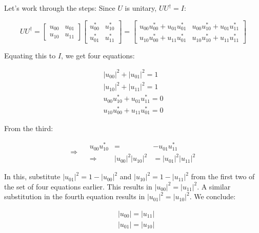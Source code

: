 \documentclass[main.tex]{subfiles}
\begin{document}
    Let's work through the steps: Since $U$ is unitary, $U U^{\dagger}=I$:
    
    $$
    U U^{\dagger}=\left[\begin{array}{ll}
    u_{00} & u_{01} \\
    u_{10} & u_{11}
    \end{array}\right]\left[\begin{array}{ll}
    u_{00}^{*} & u_{10}^{*} \\
    u_{01}^{*} & u_{11}^{*}
    \end{array}\right]=\left[\begin{array}{ll}
    u_{00} u_{00}^{*}+u_{01} u_{01}^{*} & u_{00} u_{10}^{*}+u_{01} u_{11}^{*} \\
    u_{10} u_{00}^{*}+u_{11} u_{01}^{*} & u_{10} u_{10}^{*}+u_{11} u_{11}^{*}
    \end{array}\right]
    $$
    
    Equating this to $I$, we get four equations:
    
    $$
    \begin{array}{r}
    \left|u_{00}\right|^{2}+\left|u_{01}\right|^{2}=1 \\
    \left|u_{10}\right|^{2}+\left|u_{11}\right|^{2}=1 \\
    u_{00} u_{10}^{*}+u_{01} u_{11}^{*}=0 \\
    u_{10} u_{00}^{*}+u_{11} u_{01}^{*}=0
    \end{array}
    $$
    
    From the third:
    
    $$
    \Rightarrow \quad \begin{array}{lll}
    u_{00} u_{10}^{*} & = & -u_{01} u_{11}^{*} \\
    \Rightarrow \quad & \left|u_{00}\right|^{2}\left|u_{10}\right|^{2} & =\left|u_{01}\right|^{2}\left|u_{11}\right|^{2}
    \end{array}
    $$
    
    In this, substitute $\left|u_{01}\right|^{2}=1-\left|u_{00}\right|^{2}$ and $\left|u_{10}\right|^{2}=1-\left|u_{11}\right|^{2}$ from the first two of the set of four equations earlier. This results in $\left|u_{00}\right|^{2}=\left|u_{11}\right|^{2}$. A similar substitution in the fourth equation results in $\left|u_{01}\right|^{2}=\left|u_{10}\right|^{2}$. We conclude:
    
    $$
    \begin{aligned}
    &\left|u_{00}\right|=\left|u_{11}\right| \\
    &\left|u_{01}\right|=\left|u_{10}\right|
    \end{aligned}
    $$
    
\end{document}
